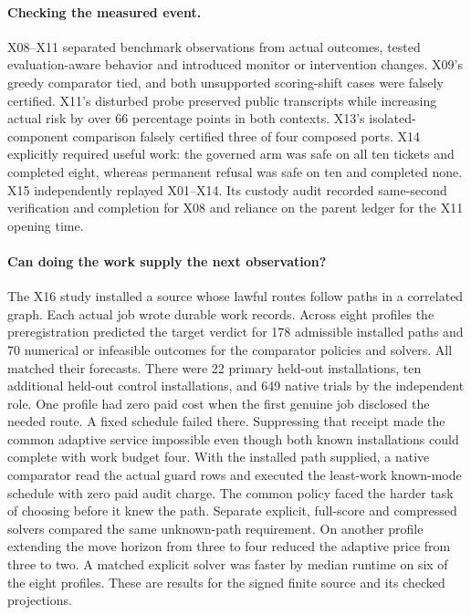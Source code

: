 \paragraph{Checking the measured event.}
X08--X11 separated benchmark observations from actual outcomes, tested evaluation-aware behavior and introduced monitor or intervention changes. X09's greedy comparator tied, and both unsupported scoring-shift cases were falsely certified. X11's disturbed probe preserved public transcripts while increasing actual risk by over 66 percentage points in both contexts. X13's isolated-component comparison falsely certified three of four composed ports. X14 explicitly required useful work: the governed arm was safe on all ten tickets and completed eight, whereas permanent refusal was safe on ten and completed none. X15 independently replayed X01--X14. Its custody audit recorded same-second verification and completion for X08 and reliance on the parent ledger for the X11 opening time.

\paragraph{Can doing the work supply the next observation?}
The X16 study \citep{expx16} installed a source whose lawful routes follow paths in a correlated graph. Each actual job wrote durable work records. Across eight profiles the preregistration predicted the target verdict for 178 admissible installed paths and 70 numerical or infeasible outcomes for the comparator policies and solvers. All matched their forecasts. There were 22 primary held-out installations, ten additional held-out control installations, and 649 native trials by the independent role. One profile had zero paid cost when the first genuine job disclosed the needed route. A fixed schedule failed there. Suppressing that receipt made the common adaptive service impossible even though both known installations could complete with work budget four. With the installed path supplied, a native comparator read the actual guard rows and executed the least-work known-mode schedule with zero paid audit charge. The common policy faced the harder task of choosing before it knew the path. Separate explicit, full-score and compressed solvers compared the same unknown-path requirement. On another profile extending the move horizon from three to four reduced the adaptive price from three to two. A matched explicit solver was faster by median runtime on six of the eight profiles. These are results for the signed finite source and its checked projections.

